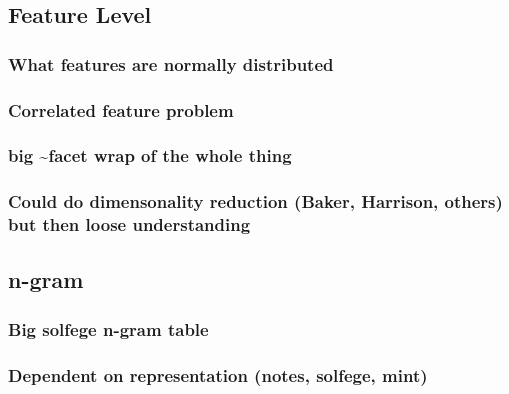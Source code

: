 \documentclass[]{book}
\theoremstyle{definition}
\theoremstyle{definition}
\theoremstyle{definition}
\theoremstyle{remark}
\begin{document}
\hypertarget{feature-level}{%
\subsection{Feature Level}\label{feature-level}}

\hypertarget{what-features-are-normally-distributed}{%
\subsubsection{What features are normally
distributed}\label{what-features-are-normally-distributed}}

\hypertarget{correlated-feature-problem}{%
\subsubsection{Correlated feature
problem}\label{correlated-feature-problem}}

\hypertarget{big-facet-wrap-of-the-whole-thing}{%
\subsubsection{big \textasciitilde{}facet wrap of the whole
thing}\label{big-facet-wrap-of-the-whole-thing}}

\hypertarget{could-do-dimensonality-reduction-baker-harrison-others-but-then-loose-understanding}{%
\subsubsection{Could do dimensonality reduction (Baker, Harrison,
others) but then loose
understanding}\label{could-do-dimensonality-reduction-baker-harrison-others-but-then-loose-understanding}}

\hypertarget{n-gram}{%
\subsection{n-gram}\label{n-gram}}

\hypertarget{big-solfege-n-gram-table}{%
\subsubsection{Big solfege n-gram
table}\label{big-solfege-n-gram-table}}

\hypertarget{dependent-on-representation-notes-solfege-mint}{%
\subsubsection{Dependent on representation (notes, solfege,
mint)}\label{dependent-on-representation-notes-solfege-mint}}
\end{document}
